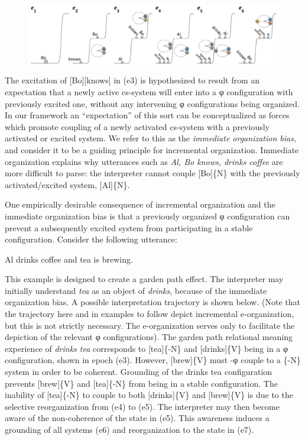   
\begin{figure}
\includegraphics[width=\textwidth]{figures/Tilsen-img129.png}
\caption{\missingcaption}
\label{fig:6:10}
\end{figure}
 

  The excitation of [Bo][knows] in (e3) is hypothesized to result from an expectation that a newly active cs-system will enter into a φ configuration with previously excited one, without any intervening φ configurations being organized. In our framework an “expectation” of this sort can be conceptualized as forces which promote coupling of a newly activated cs-system with a previously activated or excited system. We refer to this as the \textit{immediate organization bias}, and consider it to be a guiding principle for incremental organization. Immediate organization explains why utterances such as \textit{Al, Bo knows, drinks coffee} are more difficult to parse: the interpreter cannot couple [Bo]\{N\} with the previously activated/excited system, [Al]\{N\}.

  One empirically desirable consequence of incremental organization and the immediate organization bias is that a previously organized φ configuration can prevent a subsequently excited system from participating in a stable configuration. Consider the following utterance: 

\ea
Al drinks coffee and tea is brewing.
\z   

  This example is designed to create a garden path effect. The interpreter may initially understand \textit{tea} as an object of \textit{drinks}, because of the immediate organization bias. A possible interpretation trajectory is shown below. (Note that the trajectory here and in examples to follow depict incremental e-organization, but this is not strictly necessary. The e-organization serves only to facilitate the depiction of the relevant φ configurations). The garden path relational meaning experience of \textit{drinks tea} corresponds to [tea]\{-N\} and [drinks]\{V\} being in a φ configuration, shown in epoch (e3).  However, [brew]\{V\} must -φ couple to a \{-N\} system in order to be coherent. Grounding of the {\textbar}drinks tea{\textbar} configuration prevents [brew]\{V\} and [tea]\{-N\} from being in a stable configuration. The inability of [tea]\{-N\} to couple to both [drinks]\{V\} and [brew]\{V\} is due to the selective reorganization from (e4) to (e5). The interpreter may then become aware of the non-coherence of the state in (e5). This awareness induces a grounding of all systems (e6) and reorganization to the state in (e7). 

